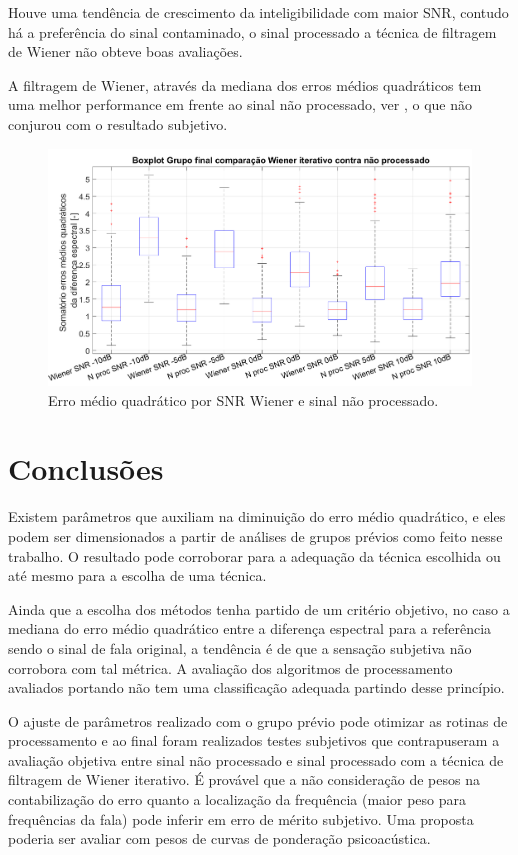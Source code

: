 Houve uma tendência de crescimento da inteligibilidade com maior SNR, contudo há a preferência do sinal contaminado, o sinal processado a técnica de filtragem de Wiener não obteve boas avaliações.

A filtragem de Wiener, através da mediana dos erros médios quadráticos tem uma melhor performance em frente ao sinal não processado, ver , o que não conjurou com o resultado subjetivo. 

\begin{figure}[H]
\centering
\includegraphics[width=14cm]{Figs/comparacao_wiener_Nproc}
\caption{Erro médio quadrático por SNR Wiener e sinal não processado.}
\label{versus}
\end{figure}


\chapter{Conclusões}
Existem parâmetros que auxiliam na diminuição do erro médio quadrático, e eles podem ser dimensionados a partir de análises de grupos prévios como feito nesse trabalho. O resultado pode corroborar para a adequação da técnica escolhida ou até mesmo para a escolha de uma técnica.

Ainda que a escolha dos métodos tenha partido de um critério objetivo, no caso a mediana do erro médio quadrático entre a diferença espectral para a referência sendo o sinal de fala original, a tendência é de que a sensação subjetiva não corrobora com tal métrica. A avaliação dos algoritmos de processamento avaliados portando não tem uma classificação adequada partindo desse princípio.

O ajuste de parâmetros realizado com o grupo prévio pode otimizar as rotinas de processamento e ao final foram realizados testes subjetivos que contrapuseram a avaliação objetiva entre sinal não processado e sinal processado com a técnica de filtragem de Wiener iterativo. É provável que a não consideração de pesos na contabilização do erro quanto a localização da frequência (maior peso para frequências da fala) pode inferir em erro de mérito subjetivo. Uma proposta poderia ser avaliar com pesos de curvas de ponderação psicoacústica.


